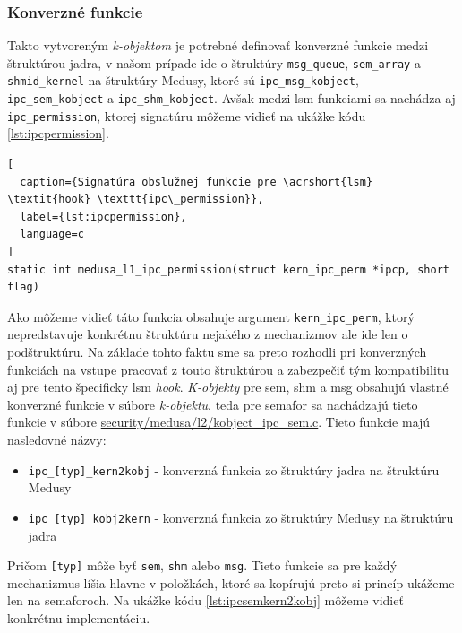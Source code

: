 \subsubsection{Konverzné funkcie} \label{converse}
Takto vytvoreným \textit{k-objektom} je potrebné definovať konverzné funkcie medzi štruktúrou jadra, v našom prípade ide o štruktúry \texttt{msg\_queue}, \texttt{sem\_array} a \texttt{shmid\_kernel} na štruktúry Medusy, ktoré sú \texttt{ipc\_msg\_kobject}, \texttt{ipc\_sem\_kobject} a \texttt{ipc\_shm\_kobject}. Avšak medzi \acrshort{lsm} funkciami sa nachádza aj \texttt{ipc\_permission}, ktorej signatúru môžeme vidieť na ukážke kódu \ref{lst:ipcpermission}.
\begin{lstlisting}[
  caption={Signatúra obslužnej funkcie pre \acrshort{lsm} \textit{hook} \texttt{ipc\_permission}},
  label={lst:ipcpermission},
  language=c
]
static int medusa_l1_ipc_permission(struct kern_ipc_perm *ipcp, short flag)
\end{lstlisting}
Ako môžeme vidieť táto funkcia obsahuje argument \texttt{kern\_ipc\_perm}, ktorý nepredstavuje konkrétnu štruktúru nejakého z mechanizmov ale ide len o podštruktúru. Na základe tohto faktu sme sa preto rozhodli pri konverzných funkciách na vstupe pracovať z touto štruktúrou a zabezpečiť tým kompatibilitu aj pre tento špecificky \acrshort{lsm} \textit{hook}. \textit{K-objekty} pre \acrshort{sem}, \acrshort{shm} a \acrshort{msg} obsahujú vlastné konverzné funkcie v súbore \textit{k-objektu}, teda pre semafor sa nachádzajú tieto funkcie v súbore \url{security/medusa/l2/kobject_ipc_sem.c}. Tieto funkcie majú nasledovné názvy:
\begin{itemize}
\item \texttt{ipc\_[typ]\_kern2kobj} - konverzná funkcia zo štruktúry jadra na štruktúru Medusy
\item \texttt{ipc\_[typ]\_kobj2kern} - konverzná funkcia zo štruktúry Medusy na štruktúru jadra
\end{itemize}
Pričom \texttt{[typ]} môže byť \texttt{sem}, \texttt{shm} alebo \texttt{msg}. Tieto funkcie sa pre každý mechanizmus líšia hlavne v položkách, ktoré sa kopírujú preto si princíp ukážeme len na semaforoch. Na ukážke kódu \ref{lst:ipcsemkern2kobj} môžeme vidieť konkrétnu implementáciu. 
